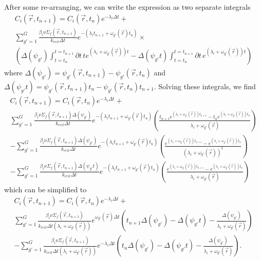 \documentclass[12pt]{report}
\begin{document}
	After some re-arranging, we can write the expression as two separate integrals
	\begin{eqnarray}
	C_i(\vec{r},t_{n+1}) =  C_i(\vec{r},t_{n}) e^{-\lambda_i \Delta t} + \nonumber \\  \sum_{g'=1}^{G} \frac{\beta_i \nu\Sigma_f(\vec{r},t_{n+1})}{k_{crit} \Delta t} e^{-\left(\lambda_i t_{n+1} + \omega_{g'}(\vec{r}) t_n \right)} 
	\times \nonumber \\ 
	\left(  \Delta(\psi_{g'}) \int_{t=t_n}^{t=t_{n+1}}  \partial t \, t e^{\left(\lambda_i + \omega_{g'}(\vec{r}) \right)  t} - \Delta(\psi_{g'} t) \int_{t=t_n}^{t=t_{n+1}}  \partial t \, e^{\left(\lambda_i + \omega_{g'}(\vec{r}) \right)  t} \right) \nonumber
	\end{eqnarray}
	where $\Delta(\psi_{g'}) =   \psi_{g'}(\vec{r},t_{n+1}) - \psi_{g'}(\vec{r},t_n)$ and $\Delta(\psi_{g'}t) =   \psi_{g'}(\vec{r},t_{n+1}) t_n - \psi_{g'}(\vec{r},t_n) t_{n+1}$. Solving these integrals, we find	
	\begin{eqnarray}
	C_i(\vec{r},t_{n+1}) =  C_i(\vec{r},t_{n}) e^{-\lambda_i \Delta t} + \nonumber \\  \sum_{g'=1}^{G} \frac{\beta_i \nu\Sigma_f(\vec{r},t_{n+1}) \Delta(\psi_{g'})}{k_{crit} \Delta t} e^{-\left(\lambda_i t_{n+1} + \omega_{g'}(\vec{r}) t_n \right)}  \left( \frac{t_{n+1} e^{\left(\lambda_i + \omega_{g'}(\vec{r}) \right)  t_{n+1}} - t_n e^{\left(\lambda_i + \omega_{g'}(\vec{r}) \right)  t_{n}}}{\lambda_i + \omega_{g'}(\vec{r})} \right) \nonumber \\
	- \sum_{g'=1}^{G} \frac{\beta_i\nu\Sigma_f(\vec{r},t_{n+1}) \Delta(\psi_{g'})}{k_{crit} \Delta t} e^{-\left(\lambda_i t_{n+1} + \omega_{g'}(\vec{r}) t_n \right)} \left( \frac{e^{\left(\lambda_i + \omega_{g'}(\vec{r}) \right)  t_{n+1}} - e^{\left(\lambda_i + \omega_{g'}(\vec{r}) \right)  t_{n}}}{\left(\lambda_i + \omega_{g'}(\vec{r})\right)^2}\right)
	 \nonumber \\ 
	 - \sum_{g'=1}^{G} \frac{\beta_i\nu\Sigma_f(\vec{r},t_{n+1}) \Delta(\psi_{g'}t)}{k_{crit} \Delta t} e^{-\left(\lambda_i t_{n+1} + \omega_{g'}(\vec{r}) t_n \right)} \left(\frac{e^{\left(\lambda_i + \omega_{g'}(\vec{r}) \right)  t_{n+1}} - e^{\left(\lambda_i + \omega_{g'}(\vec{r}) \right)  t_{n}}}{\lambda_i + \omega_{g'}(\vec{r})}\right) \nonumber
	\end{eqnarray}
	which can be simplified to
	\begin{eqnarray}
	C_i(\vec{r},t_{n+1}) =  C_i(\vec{r},t_{n}) e^{-\lambda_i \Delta t} + \nonumber \\  \sum_{g'=1}^{G} \frac{\beta_i \nu\Sigma_f(\vec{r},t_{n+1})}{k_{crit} \Delta t \left(\lambda_i + \omega_{g'}(\vec{r})\right)} e^{ \omega_{g'}(\vec{r}) \Delta t} \left( t_{n+1} \Delta(\psi_{g'}) - \Delta(\psi_{g'}t) - \frac{\Delta(\psi_{g'})}{\lambda_i + \omega_{g'}(\vec{r})} \right) \nonumber \\ 
	- \sum_{g'=1}^{G} \frac{\beta_i \nu\Sigma_f(\vec{r},t_{n+1})}{k_{crit} \Delta t \left(\lambda_i + \omega_{g'}(\vec{r})\right)} e^{-\lambda_i \Delta t} \left( t_{n} \Delta(\psi_{g'}) - \Delta(\psi_{g'}t) - \frac{\Delta(\psi_{g'})}{\lambda_i + \omega_{g'}(\vec{r})} \right). \nonumber
	\end{eqnarray}	
\end{document}
